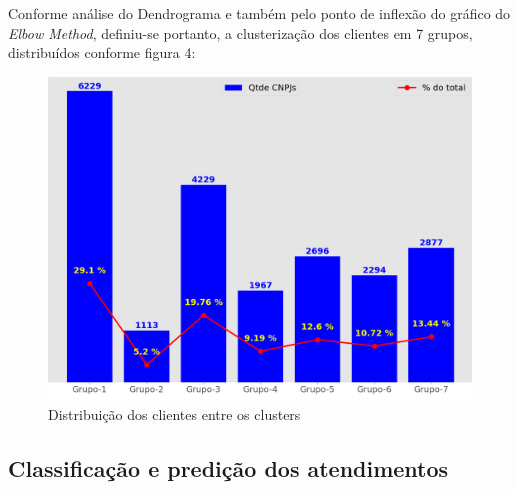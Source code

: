 \documentclass[twocolumn]{rbef}
\newcommand{\1}{\mathbbm{1}}
\begin{document}
\newline\linebreak Conforme análise do Dendrograma e também pelo ponto de inflexão do gráfico do \emph{Elbow Method}, definiu-se portanto, a clusterização dos clientes em 7 grupos, distribuídos conforme figura 4:
\begin{figure}[!htb]
  \includegraphics[scale=0.26]{4. Distribuição_CNPJs_clusters_7.png}
  \caption{Distribuição dos clientes entre os clusters}
  \label{fig4}
\end{figure}
\subsection{Classificação e predição dos atendimentos} \label{Sessao4.2}
\end{document}
